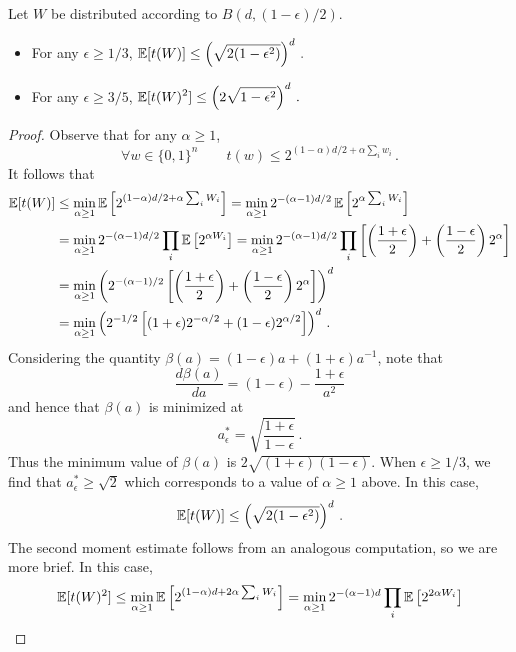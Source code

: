 \begin{proposition}\label{prop:moments-t-large-eps}
  Let $W$ be distributed according to $B(d,(1 - \epsilon)/2)$.
  \begin{itemize}
  \item For any $\epsilon \geq 1/3$, \quad $\displaystyle \operatorname{\mathbb{E}}[t(W)] \leq \left(\sqrt{2(1 - \epsilon^2)}\right)^d\,.$
  \item For any $\epsilon \geq 3/5$, \quad $\displaystyle \operatorname{\mathbb{E}}[t(W)^2] \leq \left(2\sqrt{1 - \epsilon^2}\right)^d\,.$
  \end{itemize}
  \end{proposition}

\begin{proof}
  Observe that for any $\alpha \geq 1$,
  \[
    \forall w\in \{0,1\}^n \qquad t(w) \leq 2^{(1 - \alpha)d/2 + \alpha\sum_i w_i}\,.
  \]
  It follows that
  \begin{align*}
    \operatorname{\mathbb{E}}[ t(W) ] &\leq \min_{\alpha \geq 1} \operatorname{\mathbb{E}}\left[2^{(1 - \alpha)d/2 + \alpha\sum_i W_i}\right] = \min_{\alpha \geq 1} 2^{-(\alpha - 1)d/2} \operatorname{\mathbb{E}}\left[2^{\alpha\sum_i W_i}\right]\\
                 &= \min_{\alpha \geq 1} 2^{-(\alpha - 1)d/2} \prod_i \operatorname{\mathbb{E}}\left[2^{\alpha W_i}\right] = \min_{\alpha \geq 1} 2^{-(\alpha - 1)d/2} \prod_i \left[\left(\frac{1+\epsilon}{2}\right) + \left(\frac{1-\epsilon}{2}\right) 2^{\alpha}\right]\\
  &= \min_{\alpha \geq 1} \left(2^{-(\alpha - 1)/2} \left[\left(\frac{1+\epsilon}{2}\right) + \left(\frac{1-\epsilon}{2}\right) 2^{\alpha}\right]\right)^d \\
  &= \min_{\alpha \geq 1} \left(2^{-1/2} \left[(1+\epsilon)2^{-\alpha/2}  + (1-\epsilon) 2^{\alpha/2}\right]\right)^d\,.
\end{align*}
Considering the quantity
$\beta(a) = (1 - \epsilon) a + (1 + \epsilon) a^{-1}$, note that
\[
  \frac{d\beta(a)}{da} = (1 - \epsilon) - \frac{1 + \epsilon}{a^2}
\]
and hence that $\beta(a)$ is minimized at
\[
  a^*_\epsilon = \sqrt{\frac{1 + \epsilon}{1 - \epsilon}}\,.
\]
Thus the minimum value of $\beta(a)$ is
$2\sqrt{(1 + \epsilon)(1 - \epsilon)}$. When $\epsilon \geq 1/3$, we find that $a_\epsilon^* \geq \sqrt{2}$ which corresponds to a value of $\alpha \geq 1$ above. In this case, 
\[
  \operatorname{\mathbb{E}}[t(W)] \leq \left( \sqrt{2(1 - \epsilon^2)}\right)^d\,.
\]
The second moment estimate follows from an analogous computation, so
we are more brief. In this case,
  \begin{align*}
    \Exp[ t(W)^2 ] &\leq \min_{\alpha \geq 1} \Exp\left[2^{(1 - \alpha)d + 2\alpha\sum_i W_i}\right] = \min_{\alpha \geq 1} 2^{-(\alpha - 1)d} \prod_i \Exp\left[2^{2\alpha W_i}\right]\\

\end{align*}
\end{proof}
